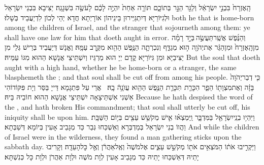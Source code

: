 {הָֽאֶזְרָח֙ בִּבְנֵ֣י יִשְׂרָאֵ֔ל וְלַגֵּ֖ר הַגָּ֣ר בְּתוֹכָ֑ם תּוֹרָ֤ה אַחַת֙ יִהְיֶ֣ה לָכֶ֔ם לָעֹשֶׂ֖ה בִּשְׁגָגָֽה׃}
{יַצִּיבָא בִּבְנֵי יִשְׂרָאֵל וּלְגִיּוֹרַיָּא דְּיִתְגַּיְּירוּן בֵּינֵיהוֹן אוֹרָיְתָא חֲדָא יְהֵי לְכוֹן לִדְיַעֲבֵיד בְּשָׁלוּ׃}
{both he that is home-born among the children of Israel, and the stranger that sojourneth among them: ye shall have one law for him that doeth aught in error.}{}
{וְהַנֶּ֜פֶשׁ אֲשֶֽׁר\maqqaf תַּעֲשֶׂ֣ה \legarmeh  בְּיָ֣ד רָמָ֗ה מִן\maqqaf הָֽאֶזְרָח֙ וּמִן\maqqaf הַגֵּ֔ר אֶת\maqqaf יְהֹוָ֖ה ה֣וּא מְגַדֵּ֑ף וְנִכְרְתָ֛ה הַנֶּ֥פֶשׁ הַהִ֖וא מִקֶּ֥רֶב עַמָּֽהּ׃}
{וֶאֱנָשׁ דְּיַעֲבֵיד בְּרֵישׁ גְּלֵי מִן יַצִּיבַיָּא וּמִן גִּיּוֹרַיָּא קֳדָם יְיָ הוּא מַרְגֵּיז וְיִשְׁתֵּיצֵי אֲנָשָׁא הַהוּא מִגּוֹ עַמֵּיהּ׃}
{But the soul that doeth aught with a high hand, whether he be home-born or a stranger, the same blasphemeth the \lord; and that soul shall be cut off from among his people.}{}
{כִּ֤י דְבַר\maqqaf יְהֹוָה֙ בָּזָ֔ה וְאֶת\maqqaf מִצְוָת֖וֹ הֵפַ֑ר הִכָּרֵ֧ת \pasek  תִּכָּרֵ֛ת הַנֶּ֥פֶשׁ הַהִ֖וא עֲוֺנָ֥הֿ בָֽהּ׃ \petucha }
{אֲרֵי עַל פִּתְגָמָא דַּייָ בַּסַּר וְיָת פִּקּוֹדוֹהִי אַשְׁנִי אִשְׁתֵּיצָאָה יִשְׁתֵּיצֵי אֲנָשָׁא הַהוּא חוֹבֵיהּ בֵּיהּ׃}
{Because he hath despised the word of the \lord, and hath broken His commandment; that soul shall utterly be cut off, his iniquity shall be upon him.}{}
{וַיִּהְי֥וּ בְנֵֽי\maqqaf יִשְׂרָאֵ֖ל בַּמִּדְבָּ֑ר וַֽיִּמְצְא֗וּ אִ֛ישׁ מְקֹשֵׁ֥שׁ עֵצִ֖ים בְּי֥וֹם הַשַּׁבָּֽת׃}
{וַהֲווֹ בְנֵי יִשְׂרָאֵל בְּמַדְבְּרָא וְאַשְׁכַּחוּ גְּבַר כַּד מְגָבֵיב אָעִין בְּיוֹמָא דְּשַׁבְּתָא׃}
{And while the children of Israel were in the wilderness, they found a man gathering sticks upon the sabbath day.}{}
{וַיַּקְרִ֣יבוּ אֹת֔וֹ הַמֹּצְאִ֥ים אֹת֖וֹ מְקֹשֵׁ֣שׁ עֵצִ֑ים אֶל\maqqaf מֹשֶׁה֙ וְאֶֽל\maqqaf אַהֲרֹ֔ן וְאֶ֖ל כׇּל\maqqaf הָעֵדָֽה׃}
{וְקָרִיבוּ יָתֵיהּ דְּאַשְׁכַּחוּ יָתֵיהּ כַּד מְגָבֵיב אָעִין לְוָת מֹשֶׁה וּלְוָת אַהֲרֹן וּלְוָת כָּל כְּנִשְׁתָּא׃}
